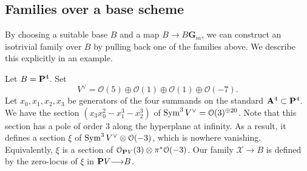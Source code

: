 \documentclass[11pt,reqno, letterpaper]{amsart}
\renewcommand{\to}{{\longrightarrow}}
\numberwithin{equation}{section}
\newcommand{\G}{\mathbf G}
\begin{document}
\subsection{Families over a base scheme}\label{sec:schematicexample}
By choosing a suitable base $B$ and a map $B \to B \G_m$, we
can construct an isotrivial family over $B$ by pulling back one of the
families above.  We describe this explicitly in an example.

Let $B = \P^4$.  Set
\[V^\vee = \mathcal O(5) \oplus \mathcal O(1) \oplus \mathcal O(1) \oplus
  \mathcal O(-7).\] Let $x_0, x_1, x_2, x_3$ be generators of the four
summands on the standard $\A^4 \subset \P^4$.  We have
the section $(x_3x_0^2-x_1^3-x_2^3)$ of
$\Sym^3 V^\vee = \mathcal O(3)^{\oplus 20}$.  Note that this section has a
pole of order $3$ along the hyperplane at infinity.  As a result, it
defines a section $\xi$ of $\Sym^3 V^\vee \otimes \mathcal O(-3)$, which is
nowhere vanishing.  Equivalently, $\xi$ is a section of
$\mathcal O_{\P V}(3) \otimes \pi^* \mathcal O(-3)$.  Our family
$\mathcal X \to B$ is defined by the zero-locus of $\xi$ in
$\P V \to B$.
\end{document}
